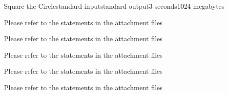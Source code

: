 \begin{problem}{Square the Circle}{standard input}{standard output}{3 seconds}{1024 megabytes}

Please refer to the statements in the attachment files

\InputFile
Please refer to the statements in the attachment files

\OutputFile
Please refer to the statements in the attachment files

\Interaction
Please refer to the statements in the attachment files

\Example

\begin{example}
%
\end{example}

\Note
Please refer to the statements in the attachment files

\end{problem}


